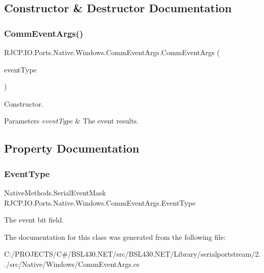 \subsection{Constructor \& Destructor Documentation}
\mbox{\label{class_r_j_c_p_1_1_i_o_1_1_ports_1_1_native_1_1_windows_1_1_comm_event_args_a09d2e2258f2419844bc298112997b55d}} 
\subsubsection{\texorpdfstring{CommEventArgs()}{CommEventArgs()}}
{\footnotesize\ttfamily R\+J\+C\+P.\+I\+O.\+Ports.\+Native.\+Windows.\+Comm\+Event\+Args.\+Comm\+Event\+Args (\begin{DoxyParamCaption}\item[{Native\+Methods.\+Serial\+Event\+Mask}]{event\+Type }\end{DoxyParamCaption})}



Constructor. 


\begin{DoxyParams}{Parameters}
{\em event\+Type} & The event results.\\
\hline
\end{DoxyParams}


\subsection{Property Documentation}
\mbox{\label{class_r_j_c_p_1_1_i_o_1_1_ports_1_1_native_1_1_windows_1_1_comm_event_args_a80bd227c89173c912943943b842b4e84}} 
\subsubsection{\texorpdfstring{EventType}{EventType}}
{\footnotesize\ttfamily Native\+Methods.\+Serial\+Event\+Mask R\+J\+C\+P.\+I\+O.\+Ports.\+Native.\+Windows.\+Comm\+Event\+Args.\+Event\+Type\hspace{0.3cm}{\ttfamily [get]}}



The event bit field. 



The documentation for this class was generated from the following file\+:\begin{DoxyCompactItemize}
\item 
C\+:/\+P\+R\+O\+J\+E\+C\+T\+S/\+C\#/\+B\+S\+L430.\+N\+E\+T/src/\+B\+S\+L430.\+N\+E\+T/\+Library/serialportstream/2../src/\+Native/\+Windows/Comm\+Event\+Args.\+cs\end{DoxyCompactItemize}
